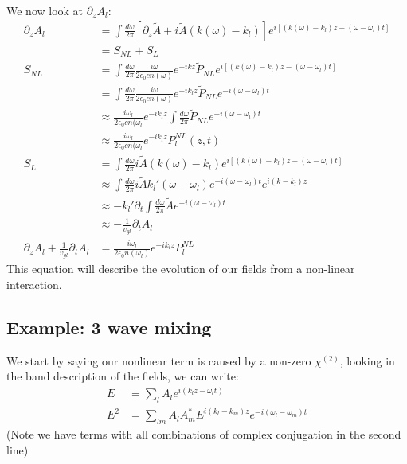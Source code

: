 We now look at $\partial_z A_l$:
\begin{align*}
	\partial_z A_l &= \int \frac{d\omega}{2\pi} \left[\partial_z \tilde{A} + i\tilde{A}(k(\omega)-k_l)\right] e^{i[(k(\omega)-k_l)z - (\omega - \omega_l)  t]} \\
	&= S_{NL} + S_L \\
	S_{NL} &=  \int \frac{d\omega}{2\pi} \frac{i\omega}{2\epsilon_0 c n(\omega)} e^{-ikz} \tilde{P}_{NL}e^{i[(k(\omega)-k_l)z - (\omega - \omega_l)  t]} \\
	&=  \int \frac{d\omega}{2\pi} \frac{i\omega}{2\epsilon_0 c n(\omega)} e^{-ik_lz} \tilde{P}_{NL}e^{-i(\omega - \omega_l) t} \\
	&\approx  \frac{i\omega_l}{2\epsilon_0 cn(\omega_l} e^{-ik_l z}\int \frac{d\omega}{2\pi} \tilde{P}_{NL} e^{-i(\omega-\omega_l)t} \\
	&\approx  \frac{i\omega_l}{2\epsilon_0 cn(\omega_l} e^{-ik_l z} P_l^{NL}(z,t) \\
	S_L &= \int \frac{d\omega}{2\pi} i\tilde{A}(k(\omega)-k_l) e^{i[(k(\omega)-k_l)z - (\omega - \omega_l)  t]} \\
	&\approx \int \frac{d\omega}{2\pi} i\tilde{A}k_l'(\omega-\omega_l) e^{-i(\omega - \omega_l)  t} e^{i(k-k_l)z} \\
	&\approx -k_l'\partial_t\int \frac{d\omega}{2\pi} \tilde{A}e^{-i(\omega - \omega_l)  t} \\
	&\approx -\frac{1}{v_{gl}}\partial_t A_l \\
	\partial_z A_l +\frac{1}{v_{gl}} \partial_t A_l &= \frac{i\omega_l}{2\epsilon_0 n(\omega_l)} e^{-ik_lz} P_l^{NL}
\end{align*}
This equation will describe the evolution of our fields from a non-linear interaction.

\subsection{Example: 3 wave mixing}
We start by saying our nonlinear term is caused by a non-zero $\chi^{(2)}$, looking in the band description of the fields, we can write:
\begin{align*}
	E &= \sum_l A_l e^{i(k_l z - \omega_l t)} \\
	E^2 &= \sum_{lm} A_lA_m^* E^{i(k_l-k_m)z}e^{-i(\omega_l - \omega_m) t}
\end{align*}
(Note we have terms with all combinations of complex conjugation in the second line)

